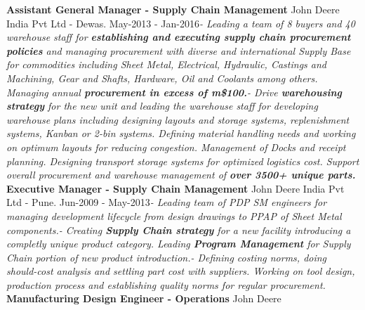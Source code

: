 \documentclass[11pt, a4paper]{awesome-cv}
\begin{document}
\textbf{Assistant General Manager - Supply Chain Management} \hfill John
Deere India Pvt Ltd - Dewas\newline . \hfill May-2013 -
Jan-2016\newline \textit{- \hspace{5mm}  Leading a team of 8 buyers and 40 warehouse staff for \textbf{establishing and executing supply chain procurement policies} and managing procurement with diverse and international Supply Base for commodities including Sheet Metal, Electrical, Hydraulic, Castings and Machining, Gear and Shafts, Hardware, Oil and Coolants among others. Managing annual \textbf{procurement in excess of m\$100.}\newline - \hspace{5mm}  Drive \textbf{warehousing strategy} for the new unit and leading the warehouse staff for developing warehouse plans including designing layouts and storage systems, replenishment systems, Kanban or 2-bin systems. Defining material handling needs and working on optimum layouts for reducing congestion. Management of Docks and receipt planning. Designing transport storage systems for optimized logistics cost. Support overall procurement and warehouse management of \textbf{over 3500+ unique parts.}}
\newline \vspace{2mm} \newline
\textbf{Executive Manager - Supply Chain Management} \hfill John Deere
India Pvt Ltd - Pune\newline . \hfill Jun-2009 -
May-2013\newline \textit{- \hspace{5mm}  Leading team of PDP SM engineers for managing development lifecycle from design drawings to PPAP of Sheet Metal components.\newline - \hspace{5mm}  Creating \textbf{Supply Chain strategy} for a new facility introducing a completly unique product category. Leading \textbf{Program Management} for Supply Chain portion of new product introduction.\newline - \hspace{5mm}  Defining costing norms, doing should-cost analysis and settling part cost with suppliers. Working on tool design, production process and establishing quality norms for regular procurement.}
\newline \vspace{2mm} \newline
\textbf{Manufacturing Design Engineer - Operations} \hfill John Deere
\end{document}
